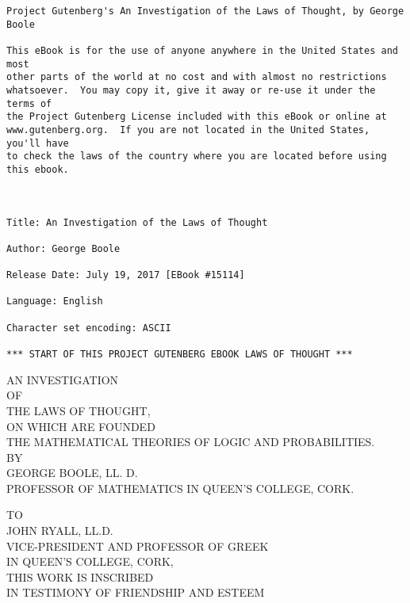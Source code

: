 \documentclass[oneside]{book}
\begin{document}
\def\thechapter{\Roman{chapter}}
\def\theequation{\arabic{equation}}
\thispagestyle{empty}
\small
\begin{verbatim}
Project Gutenberg's An Investigation of the Laws of Thought, by George Boole

This eBook is for the use of anyone anywhere in the United States and most
other parts of the world at no cost and with almost no restrictions
whatsoever.  You may copy it, give it away or re-use it under the terms of
the Project Gutenberg License included with this eBook or online at
www.gutenberg.org.  If you are not located in the United States, you'll have
to check the laws of the country where you are located before using this ebook.



Title: An Investigation of the Laws of Thought

Author: George Boole

Release Date: July 19, 2017 [EBook #15114]

Language: English

Character set encoding: ASCII

*** START OF THIS PROJECT GUTENBERG EBOOK LAWS OF THOUGHT ***
\end{verbatim}
\normalsize
\clearpage

\frontmatter

\begin{center}
AN INVESTIGATION \\
\bigskip
\bigskip
OF \\
\bigskip
\bigskip
\Huge
THE LAWS OF THOUGHT,\\
\bigskip
\normalsize
ON WHICH ARE FOUNDED \\
\bigskip
\large
THE MATHEMATICAL THEORIES OF LOGIC
AND PROBABILITIES. \\
\bigskip
\bigskip
\bigskip
\bigskip
\normalsize
BY \\
\bigskip
\large
GEORGE BOOLE, LL. D.\\
\normalsize
PROFESSOR OF MATHEMATICS IN QUEEN'S COLLEGE, CORK.
\newpage

TO\\
\bigskip
\large
JOHN RYALL, LL.D.\\
\bigskip
\normalsize
VICE-PRESIDENT AND PROFESSOR OF GREEK\\
\bigskip
IN QUEEN'S COLLEGE, CORK,\\
\bigskip
THIS WORK IS INSCRIBED\\
\bigskip
IN TESTIMONY OF FRIENDSHIP AND ESTEEM\\
\end{center}
\end{document}
